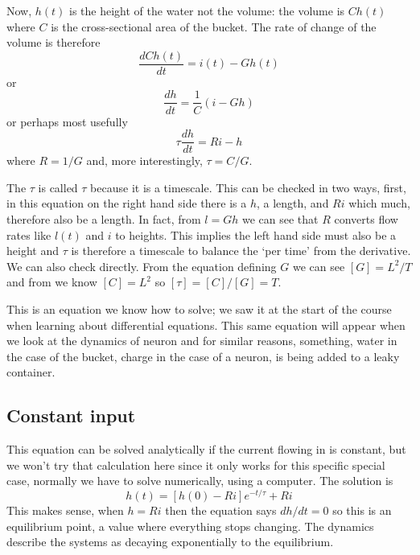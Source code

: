 \documentclass[12pt]{article}
\begin{document}
Now, $h(t)$ is the height of the water not the volume: the volume is
$Ch(t)$ where $C$ is the cross-sectional area of the bucket. The rate
of change of the volume is therefore
\begin{equation}
\frac{dCh(t)}{dt}=i(t)-Gh(t)
\end{equation}
or
\begin{equation}
\frac{dh}{dt}=\frac{1}{C}(i-Gh)
\end{equation}
or perhaps most usefully
\begin{equation}
\tau\frac{dh}{dt}=Ri-h
\end{equation}
where $R=1/G$ and, more interestingly, $\tau=C/G$.

The $\tau$ is called $\tau$ because it is a timescale. This can be
checked in two ways, first, in this equation on the right hand side
there is a $h$, a length, and $Ri$ which much, therefore also be a
length. In fact, from $l=Gh$ we can see that $R$ converts flow rates
like $l(t)$ and $i$ to heights. This implies the left hand side must
also be a height and $\tau$ is therefore a timescale to balance the
`per time' from the derivative. We can also check directly. From the
equation defining $G$ we can see $[G]=L^2/T$ and from we know
$[C]=L^2$ so $[\tau]=[C]/[G]=T$.

This is an equation we know how to solve; we saw it at the start of
the course when learning about differential equations. This same
equation will appear when we look at the dynamics of neuron and for
similar reasons, something, water in the case of the bucket, charge in
the case of a neuron, is being added to a leaky container.


\subsection*{Constant input}

This equation can be solved analytically if the current flowing in is
constant, but we won't try that calculation here since it only works
for this specific special case, normally we have to solve numerically,
using a computer. The solution is
\begin{equation}
h(t)=[h(0)-Ri]e^{-t/\tau}+Ri
\end{equation}
This makes sense, when $h=Ri$ then the equation says $dh/dt=0$ so
this is an equilibrium point, a value where everything stops
changing. The dynamics describe the systems as decaying exponentially
to the equilibrium.
\end{document}
